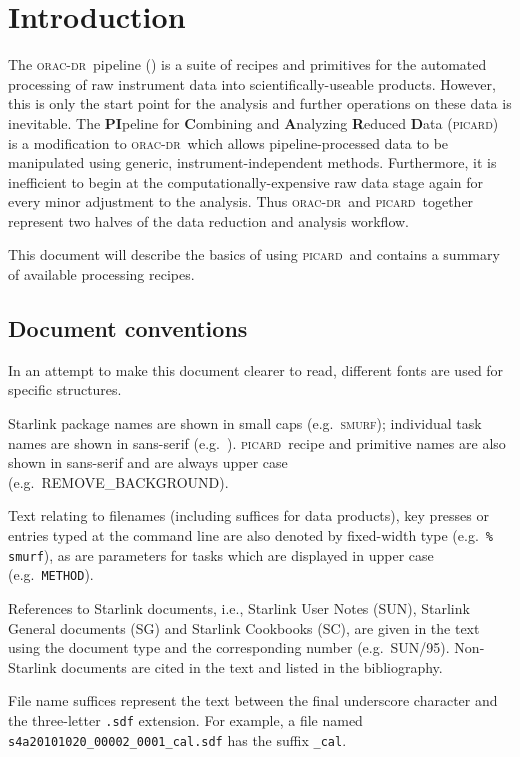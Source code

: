 \documentclass[twoside,11pt,nolof]{starlink}
\providecommand{\SMURF}{\textsc{smurf}}
\providecommand{\oracdr}{\textsc{orac-dr}}
\providecommand{\oracsun}{\xref{SUN/230}{sun230}{}}
\providecommand{\picard}{\textsc{picard}}
\providecommand{\task}[1]{\textsf{#1}}
\providecommand{\makemap}{\xref{\task{makemap}}{sun258}{MAKEMAP}}
\providecommand{\aparam}[1]{\texttt{#1}}     %
\begin{document}
\scfrontmatter

\section{Introduction\label{se:intro}}

The \oracdr\ pipeline (\oracsun) is a suite of recipes and primitives
for the automated processing of raw instrument data into
scientifically-useable products. However, this is only the start point
for the analysis and further operations on these data is
inevitable. The \textbf{PI}peline for \textbf{C}ombining and
\textbf{A}nalyzing \textbf{R}educed \textbf{D}ata (\picard) is a
modification to \oracdr\ which allows pipeline-processed data to be
manipulated using generic, instrument-independent
methods. Furthermore, it is inefficient to begin at the
computationally-expensive raw data stage again for every minor
adjustment to the analysis. Thus \oracdr\ and \picard\ together
represent two halves of the data reduction and analysis workflow.

This document will describe the basics of using \picard\ and contains
a summary of available processing recipes.

\subsection{Document conventions}

In an attempt to make this document clearer to read, different fonts
are used for specific structures.

Starlink package names are shown in small caps (e.g.\ \SMURF);
individual task names are shown in sans-serif
(e.g.\ \makemap). \picard\ recipe and primitive names are also shown
in sans-serif and are always upper case (e.g.\ \task{REMOVE\_BACKGROUND}).

Text relating to filenames (including suffices for data products), key
presses or entries typed at the command line are also denoted by
fixed-width type (e.g.\ \texttt{\% smurf}), as are parameters for
tasks which are displayed in upper case (e.g.\ \aparam{METHOD}).

References to Starlink documents, i.e., Starlink User Notes (SUN),
Starlink General documents (SG) and Starlink Cookbooks (SC), are given
in the text using the document type and the corresponding number
(e.g.\ SUN/95). Non-Starlink documents are cited in the text and
listed in the bibliography.

File name suffices represent the text between the final underscore
character and the three-letter \verb+.sdf+ extension. For example, a
file named \verb+s4a20101020_00002_0001_cal.sdf+ has the suffix
\verb+_cal+.
\end{document}
